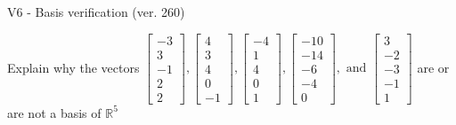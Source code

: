 \begin{exercise}
  \begin{exerciseTitle}V6 - Basis verification (ver. 260)\end{exerciseTitle}
  \begin{exerciseStatement}
    Explain why the vectors \(\left[\begin{array}{r}
-3 \\
3 \\
-1 \\
2 \\
2
\end{array}\right] , \left[\begin{array}{r}
4 \\
3 \\
4 \\
0 \\
-1
\end{array}\right] , \left[\begin{array}{r}
-4 \\
1 \\
4 \\
0 \\
1
\end{array}\right] , \left[\begin{array}{r}
-10 \\
-14 \\
-6 \\
-4 \\
0
\end{array}\right] , \text{ and } \left[\begin{array}{r}
3 \\
-2 \\
-3 \\
-1 \\
1
\end{array}\right]\) are or are not a basis of \(\mathbb{R}^5\)	



\end{exerciseStatement}
\end{exercise}
